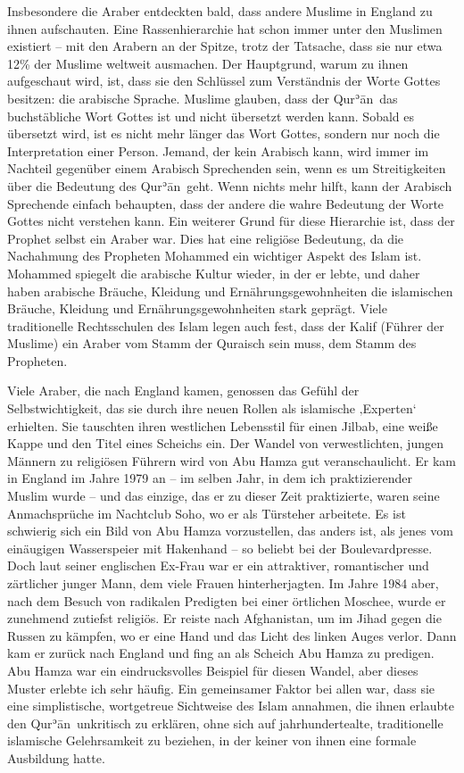 \documentclass[12pt]{memoir}
\def\´{ʾ} %
\def \Quran{Qur\-\´ān} %
\begin{document}
Insbesondere die Araber entdeckten bald,
dass andere Muslime in England zu ihnen aufschauten.
Eine Rassenhierarchie hat schon immer unter den Muslimen existiert –
mit den Arabern an der Spitze,
trotz der Tatsache, dass sie nur etwa 12\% der Muslime weltweit ausmachen.
Der Hauptgrund, warum zu ihnen aufgeschaut wird, ist,
dass sie den Schlüssel zum Verständnis der Worte Gottes besitzen:
die arabische Sprache.
Muslime glauben, dass der \Quran\ das buchstäbliche Wort Gottes ist
und nicht übersetzt werden kann.
Sobald es übersetzt wird, ist es nicht mehr länger das Wort Gottes,
sondern nur noch die Interpretation einer Person.
Jemand, der kein Arabisch kann, wird immer im Nachteil
gegenüber einem Arabisch Sprechenden sein,
wenn es um Streitigkeiten über die Bedeutung des \Quran\ geht.
Wenn nichts mehr hilft, kann der Arabisch Sprechende einfach behaupten,
dass der andere die wahre Bedeutung der Worte Gottes nicht verstehen kann.
Ein weiterer Grund für diese Hierarchie ist, dass der Prophet selbst ein Araber war.
Dies hat eine religiöse Bedeutung,
da die Nachahmung des Propheten Mohammed ein wichtiger Aspekt des Islam ist.
Mohammed spiegelt die arabische Kultur wieder, in der er lebte,
und daher haben arabische Bräuche, Kleidung und Ernährungsgewohnheiten
die islamischen Bräuche,
Kleidung und Ernährungsgewohnheiten stark geprägt.
Viele traditionelle Rechtsschulen des Islam legen auch fest,
dass der Kalif (Führer der Muslime) ein Araber
vom Stamm der Quraisch sein muss, dem Stamm des Propheten.

Viele Araber, die nach England kamen,
genossen das Gefühl der Selbstwichtigkeit,
das sie durch ihre neuen Rollen als islamische ‚Experten‘ erhielten.
Sie tauschten ihren westlichen Lebensstil
für einen Jilbab, eine weiße Kappe und den Titel eines Scheichs ein.
Der Wandel von verwestlichten, jungen Männern zu religiösen Führern
wird von Abu Hamza gut veranschaulicht.
Er kam in England im Jahre 1979 an –
im selben Jahr, in dem ich praktizierender Muslim wurde –
und das einzige, das er zu dieser Zeit praktizierte,
waren seine Anmachsprüche im Nachtclub Soho, wo er als Türsteher arbeitete.
Es ist schwierig sich ein Bild von Abu Hamza vorzustellen,
das anders ist, als jenes vom einäugigen Wasserspeier mit Hakenhand –
so beliebt bei der Boulevardpresse.
Doch laut seiner englischen Ex-Frau war er ein attraktiver,
romantischer und zärtlicher junger Mann, dem viele Frauen hinterherjagten.
Im Jahre 1984 aber, nach dem Besuch von radikalen Predigten
bei einer örtlichen Moschee,
wurde er zunehmend zutiefst religiös.
Er reiste nach Afghanistan, um im Jihad gegen die Russen zu kämpfen,
wo er eine Hand und das Licht des linken Auges verlor.
Dann kam er zurück nach England und fing an als Scheich Abu Hamza zu predigen.
Abu Hamza war ein eindrucksvolles Beispiel für diesen Wandel,
aber dieses Muster erlebte ich sehr häufig.
Ein gemeinsamer Faktor bei allen war,
dass sie eine simplistische, wortgetreue Sichtweise des Islam annahmen,
die ihnen erlaubte den \Quran\ unkritisch zu erklären,
ohne sich auf jahrhundertealte,
traditionelle islamische Gelehrsamkeit zu beziehen,
in der keiner von ihnen eine formale Ausbildung hatte.
\end{document}
